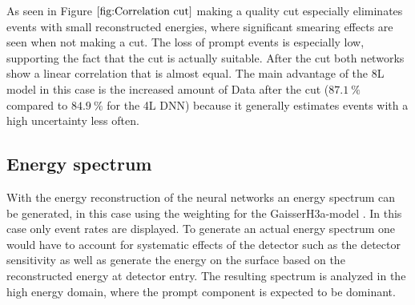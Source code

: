 \documentclass[
  tucolor,       %
  BCOR=12mm,     %
  parskip=half,  %
  open=any,      %
  cleardoublepage=plain,  %
]{tudothesis}
\begin{document}
As seen in Figure $\ref{fig:Correlation cut}$ making a quality cut especially eliminates events with small reconstructed energies, where significant smearing effects are seen when not making a cut.
The loss of prompt events is especially low, supporting the fact that the cut is actually suitable.
After the cut both networks show a linear correlation that is almost equal. The main advantage of the 8L model in this case is the increased amount of Data after the cut ($\SI{87.1}{\percent}$ compared to $\SI{84.9}{\percent}$ for the 4L DNN) because it generally estimates events with a high uncertainty less often.
\subsection{Energy spectrum}
With the energy reconstruction of the neural networks an energy spectrum can be generated, in this case using the weighting for the GaisserH3a-model \cite{gaisser2013cosmic}.
In this case only event rates are displayed. To generate an actual energy spectrum one would have to account for systematic effects of the detector such as the detector sensitivity as well as generate the energy on the surface based on the reconstructed energy at detector entry.
The resulting spectrum is analyzed in the high energy domain, where the prompt component is expected to be dominant.
\end{document}
